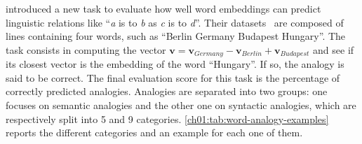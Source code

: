       \citeauthor{mikolov2013efficient} introduced a new task to evaluate how
      well word embeddings can predict linguistic relations like ``\textit{a} is
      to \textit{b} as \textit{c} is to \textit{d}''. Their
      datasets~\citep{mikolov2013efficient} are composed of lines containing
      four words, such as ``Berlin Germany Budapest Hungary''. The task consists
      in computing the vector $\mathbf{v} = \mathbf{v}_{Germany} -
      \mathbf{v}_{Berlin} + \mathbf{v}_{Budapest}$ and see if its closest vector
      is the embedding of the word ``Hungary''. If so, the analogy is said to be
      correct. The final evaluation score for this task is the percentage of
      correctly predicted analogies. Analogies are separated into two groups:
      one focuses on semantic analogies and the other one on syntactic
      analogies, which are respectively split into 5 and 9 categories.
      \autoref{ch01:tab:word-analogy-examples} reports the different categories
      and an example for each one of them.

